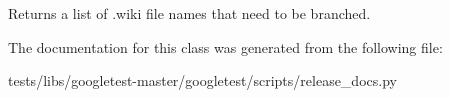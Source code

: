\begin{DoxyVerb}Returns a list of .wiki file names that need to be branched.\end{DoxyVerb}
 

The documentation for this class was generated from the following file\+:\begin{DoxyCompactItemize}
\item 
tests/libs/googletest-\/master/googletest/scripts/release\+\_\+docs.\+py\end{DoxyCompactItemize}
